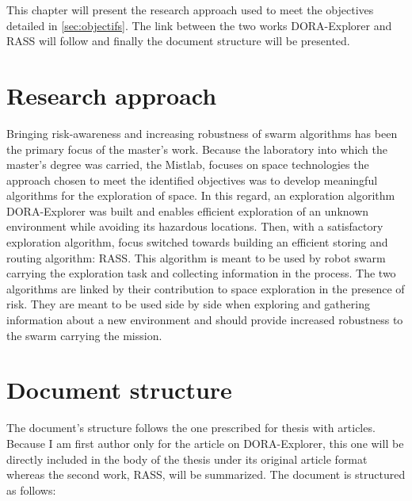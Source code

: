 \label{sec:approach}

This chapter will present the research approach used to meet the objectives detailed in \ref{sec:objectifs}. The link between the two works DORA-Explorer and RASS will follow and finally the document structure will be presented.

\section{Research approach}
Bringing risk-awareness and increasing robustness of swarm algorithms has been the primary focus of the master's work. Because the laboratory into which the master's degree was carried, the Mistlab, focuses on space technologies the approach chosen to meet the identified objectives was to develop meaningful algorithms for the exploration of space. In this regard, an exploration algorithm DORA-Explorer was built and enables efficient exploration of an unknown environment while avoiding its hazardous locations. Then, with a satisfactory exploration algorithm, focus switched towards building an efficient storing and routing algorithm: RASS. This algorithm is meant to be used by robot swarm carrying the exploration task and collecting information in the process. The two algorithms are linked by their contribution to space exploration in the presence of risk. They are meant to be used side by side when exploring and gathering information about a new environment and should provide increased robustness to the swarm carrying the mission.

\section{Document structure}
The document's structure follows the one prescribed for thesis with articles. Because I am first author only for the article on DORA-Explorer, this one will be directly included in the body of the thesis under its original article format whereas the second work, RASS, will be summarized. The document is structured as follows:

